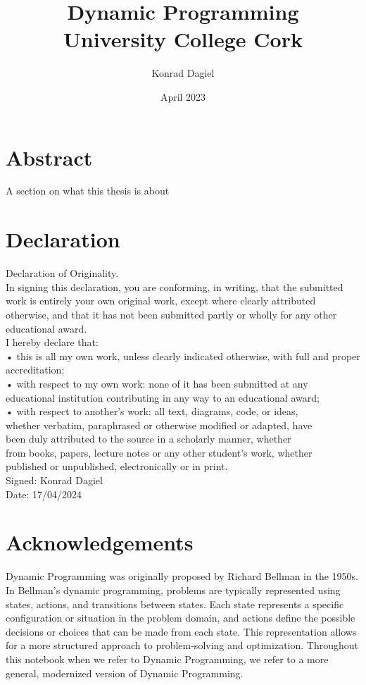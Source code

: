 \documentclass{report}
\title{\textbf{Dynamic Programming} \\
\Large{University College Cork}}
\author{Konrad Dagiel}
\date{April 2023}
\theoremstyle{definition}
\begin{document}
\maketitle

\chapter*{Abstract}
A section on what this thesis is about

\chapter*{Declaration}
Declaration of Originality.\\
In signing this declaration, you are conforming, in writing, that the submitted work is entirely your own original work, except where clearly attributed otherwise, and that it has not been submitted partly or wholly for
any other educational award.\\
I hereby declare that:\\
• this is all my own work, unless clearly indicated otherwise, with full
and proper accreditation;\\
• with respect to my own work: none of it has been submitted at any educational institution contributing in any way to an educational award;\\
• with respect to another’s work: all text, diagrams, code, or ideas,\\
whether verbatim, paraphrased or otherwise modified or adapted, have\\
been duly attributed to the source in a scholarly manner, whether\\
from books, papers, lecture notes or any other student’s work, whether\\
published or unpublished, electronically or in print.\\
Signed: Konrad Dagiel\\
Date: 17/04/2024

\chapter*{Acknowledgements}
Dynamic Programming was originally proposed by Richard Bellman in the 1950s.
In Bellman's dynamic programming, problems are typically represented using states, actions, and transitions between states.
Each state represents a specific configuration or situation in the problem domain, and actions define the possible decisions or choices that can be made from each state.
This representation allows for a more structured approach to problem-solving and optimization.
Throughout this notebook when we refer to Dynamic Programming, we refer to a more general, modernized version of Dynamic Programming.
\end{document}
